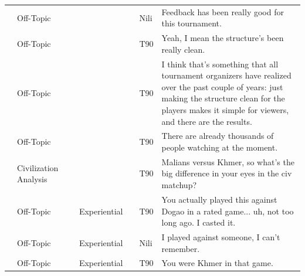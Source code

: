 {\begin{longtable}{@{}>{\theAppRow}r|L{2.3cm}L{2.2cm}L{1.4cm}L{2.2cm}L{0.5cm}U{5.6cm}@{}}
    & Off-Topic             &                      &             &                   & Nili    & Feedback has been really good for this tournament.                                                                                                                                                                       \\
    & Off-Topic             &                      &             &                   & T90     & Yeah, I mean the structure's been really clean.                                                                                                                                                                          \\
    & Off-Topic             &                      &             &                   & T90     & I think that's something that all tournament organizers have realized over the past couple of years: just making the structure clean for the players makes it simple for viewers, and there are the results.             \\
    & Off-Topic             &                      &             &                   & T90     & There are already thousands of people watching at the moment.                                                                                                                                                            \\
    & Civilization Analysis &                      &             &                   & T90     & Malians versus Khmer, so what's the big difference in your eyes in the civ matchup?                                                                                                                                      \\
    & Off-Topic             &                      & Experiential &                   & T90     & You actually played this against Dogao in a rated game... uh, not too long ago. I casted it.                                                                                                                             \\
    & Off-Topic             &                      & Experiential &                   & Nili    & I played against someone, I can't remember.                                                                                                                                                                              \\
    & Off-Topic             &                      & Experiential &                   & T90     & You were Khmer in that game.                                                                                                                                                                                             \\

\end{longtable}}
